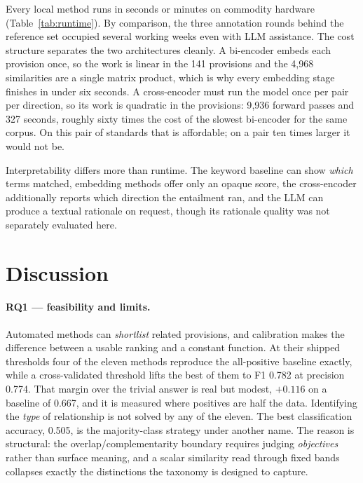 Every local method runs in seconds or minutes on commodity hardware
(Table~\ref{tab:runtime}). By comparison, the three annotation rounds behind the
reference set occupied several working weeks even with LLM assistance. The cost
structure separates the two architectures cleanly. A bi-encoder embeds each
provision once, so the work is linear in the 141 provisions and the 4{,}968
similarities are a single matrix product, which is why every embedding stage
finishes in under six seconds. A cross-encoder must run the model once per pair
per direction, so its work is quadratic in the provisions: 9{,}936 forward passes
and 327 seconds, roughly sixty times the cost of the slowest bi-encoder for the
same corpus. On this pair of standards that is affordable; on a pair ten times
larger it would not be.

Interpretability differs more than runtime. The keyword baseline can show
\emph{which} terms matched, embedding methods offer only an opaque score, the
cross-encoder additionally reports which direction the entailment ran, and the
LLM can produce a textual rationale on request, though its rationale quality was
not separately evaluated here.

\section{Discussion}\label{sec:discussion}

\paragraph{RQ1 --- feasibility and limits.}
Automated methods can \emph{shortlist} related provisions, and calibration makes
the difference between a usable ranking and a constant function. At their shipped
thresholds four of the eleven methods reproduce the all-positive baseline
exactly, while a cross-validated threshold lifts the best of them to F1 0.782 at
precision 0.774. That margin over the trivial answer is real but modest, $+0.116$
on a baseline of 0.667, and it is measured where positives are half the data.
Identifying the \emph{type} of relationship is not solved by any of the eleven.
The best classification accuracy, 0.505, is the majority-class strategy under
another name. The reason is structural: the overlap/complementarity boundary
requires judging \emph{objectives} rather than surface meaning, and a scalar
similarity read through fixed bands collapses exactly the distinctions the
taxonomy is designed to capture.

